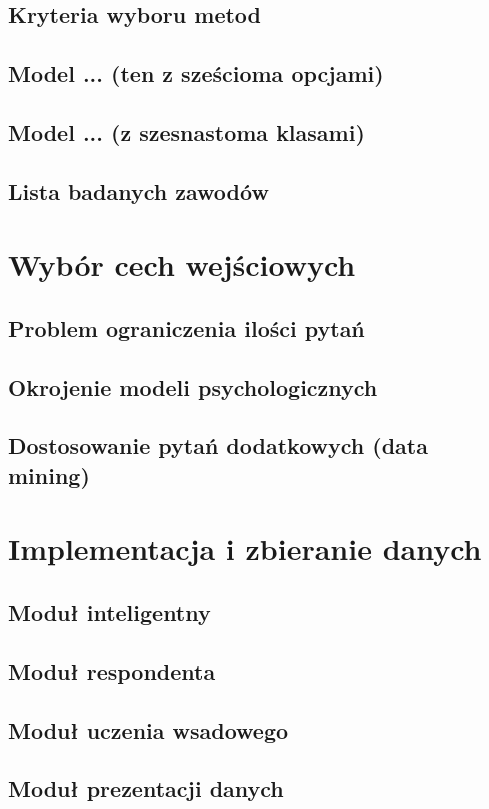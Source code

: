 \documentclass[12pt,a4paper,oneside]{report} %
\begin{document}
\subsection{Kryteria wyboru metod}
\subsection{Model ... (ten z sześcioma opcjami)}
\subsection{Model ... (z szesnastoma klasami)}
\subsection{Lista badanych zawodów}
\section{Wybór cech wejściowych}
\subsection{Problem ograniczenia ilości pytań}
\subsection{Okrojenie modeli psychologicznych}
\subsection{Dostosowanie pytań dodatkowych (data mining)}
\section{Implementacja i zbieranie danych}
\subsection{Moduł inteligentny}
\subsection{Moduł respondenta}
\subsection{Moduł uczenia wsadowego}
\subsection{Moduł prezentacji danych}
\end{document}
